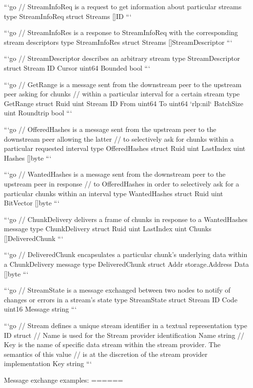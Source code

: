 ```go
// StreamInfoReq is a request to get information about particular streams
type StreamInfoReq struct {
	Streams []ID
}
```

```go
// StreamInfoRes is a response to StreamInfoReq with the corresponding stream descriptors
type StreamInfoRes struct {
	Streams []StreamDescriptor
}
```

```go
// StreamDescriptor describes an arbitrary stream
type StreamDescriptor struct {
	Stream  ID
	Cursor  uint64
	Bounded bool
}
```

```go
// GetRange is a message sent from the downstream peer to the upstream peer asking for chunks
// within a particular interval for a certain stream
type GetRange struct {
	Ruid      uint
	Stream    ID
	From      uint64
	To        uint64 `rlp:nil`
	BatchSize uint
	Roundtrip bool
}
```

```go
// OfferedHashes is a message sent from the upstream peer to the downstream peer allowing the latter
// to selectively ask for chunks within a particular requested interval
type OfferedHashes struct {
	Ruid      uint
	LastIndex uint
	Hashes    []byte
}
```

```go
// WantedHashes is a message sent from the downstream peer to the upstream peer in response
// to OfferedHashes in order to selectively ask for a particular chunks within an interval
type WantedHashes struct {
	Ruid      uint
	BitVector []byte
}
```

```go
// ChunkDelivery delivers a frame of chunks in response to a WantedHashes message
type ChunkDelivery struct {
	Ruid      uint
	LastIndex uint
	Chunks    []DeliveredChunk
}
```

```go
// DeliveredChunk encapsulates a particular chunk's underlying data within a ChunkDelivery message
type DeliveredChunk struct {
	Addr storage.Address
	Data []byte
}
```

```go
// StreamState is a message exchanged between two nodes to notify of changes or errors in a stream's state
type StreamState struct {
	Stream  ID
	Code    uint16
	Message string
}
```

```go
// Stream defines a unique stream identifier in a textual representation
type ID struct {
	// Name is used for the Stream provider identification
	Name string
	// Key is the name of specific data stream within the stream provider. The semantics of this value
	// is at the discretion of the stream provider implementation
	Key string
}
```

Message exchange examples:
======


